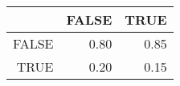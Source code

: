\begin{table}[ht]
\centering
\begin{tabular}{rrr}
  \hline
 & FALSE & TRUE \\ 
  \hline
FALSE & 0.80 & 0.85 \\ 
  TRUE & 0.20 & 0.15 \\ 
   \hline
\end{tabular}
\end{table}
